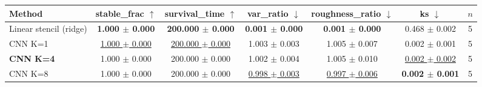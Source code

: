 \begin{tabular}{lcccccc}
\toprule
Method & stable\_frac $\uparrow$ & survival\_time $\uparrow$ & var\_ratio $\downarrow$ & roughness\_ratio $\downarrow$ & ks $\downarrow$ & $n$ \\
\midrule
Linear stencil (ridge) & \textbf{1.000 $\pm$ 0.000} & \textbf{200.000 $\pm$ 0.000} & \textbf{0.001 $\pm$ 0.000} & \textbf{0.001 $\pm$ 0.000} & 0.468 $\pm$ 0.002 & 5 \\
CNN K=1 & \underline{1.000 $\pm$ 0.000} & \underline{200.000 $\pm$ 0.000} & 1.003 $\pm$ 0.003 & 1.005 $\pm$ 0.007 & 0.002 $\pm$ 0.001 & 5 \\
\textbf{CNN K=4} & 1.000 $\pm$ 0.000 & 200.000 $\pm$ 0.000 & 1.002 $\pm$ 0.004 & 1.005 $\pm$ 0.010 & \underline{0.002 $\pm$ 0.002} & 5 \\
CNN K=8 & 1.000 $\pm$ 0.000 & 200.000 $\pm$ 0.000 & \underline{0.998 $\pm$ 0.003} & \underline{0.997 $\pm$ 0.006} & \textbf{0.002 $\pm$ 0.001} & 5 \\
\bottomrule
\end{tabular}

